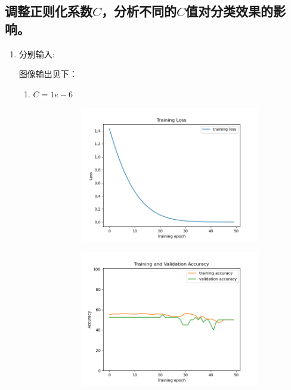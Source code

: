 \documentclass[a4paper]{article}
\begin{document}
\subsection{调整正则化系数$C$，分析不同的$C$值对分类效果的影响。}
\begin{enumerate}
    \item 分别输入:
    
    
    
    图像输出见下：
    \begin{enumerate}
        \item $C = 1e-6$
        \begin{figure}[H]
            \centering
                \begin{subfigure}[b]{.45\linewidth}
                    \includegraphics[width=\linewidth]{../../img/4-1-1.png}
                \end{subfigure}
                \begin{subfigure}[b]{.45\linewidth}
                    \includegraphics[width=\linewidth]{../../img/4-1-2.png}

\end{subfigure}
\end{figure}
\end{enumerate}
\end{enumerate}
\end{document}
